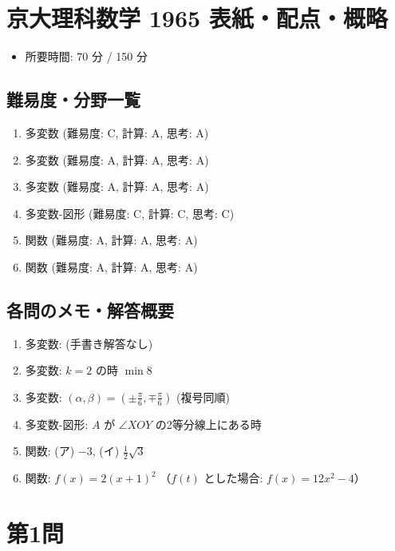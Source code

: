 \documentclass[../main.tex]{subfiles}
\begin{document}
\section*{京大理科数学 1965 表紙・配点・概略}

\begin{itemize}
  \item 所要時間: 70 分 / 150 分
\end{itemize}

\subsection*{難易度・分野一覧}
\begin{enumerate}
  \item 多変数 (難易度: C, 計算: A, 思考: A)
  \item 多変数 (難易度: A, 計算: A, 思考: A)
  \item 多変数 (難易度: A, 計算: A, 思考: A)
  \item 多変数-図形 (難易度: C, 計算: C, 思考: C)
  \item 関数 (難易度: A, 計算: A, 思考: A)
  \item 関数 (難易度: A, 計算: A, 思考: A)
\end{enumerate}

\subsection*{各問のメモ・解答概要}
\begin{enumerate}
  \item 多変数: (手書き解答なし)
  \item 多変数: $k=2$ の時 $\min 8$
  \item 多変数: $(\alpha, \beta) = \left( \pm\frac{\pi}{6}, \mp\frac{\pi}{6} \right)$ (複号同順)
  \item 多変数-図形: $A$ が $\angle XOY$ の2等分線上にある時
  \item 関数: (ア) $-3$, (イ) $\frac{1}{2}\sqrt{3}$
  \item 関数: $f(x) = 2(x+1)^2$ （$f(t)$ とした場合: $f(x) = 12x^2 - 4$）
\end{enumerate}

\newpage

\section*{第1問}

\newpage
\end{document}
